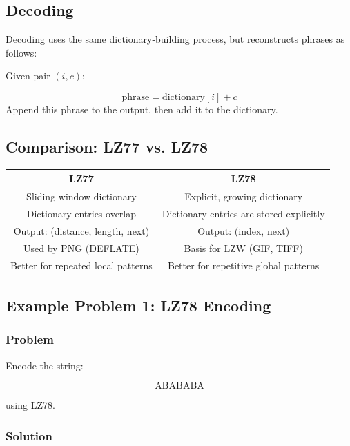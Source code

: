 \documentclass{AnantDocumentation}
\begin{document}
\subsection{Decoding}

Decoding uses the same dictionary-building process, but reconstructs phrases as follows:

Given pair \((i, c)\):

\[
\text{phrase} = \text{dictionary}[i] + c
\]
Append this phrase to the output, then add it to the dictionary.

\subsection{Comparison: LZ77 vs. LZ78}

\begin{table}[h!]
\centering
\begin{tabular}{|c|c|}
\hline
\textbf{LZ77} & \textbf{LZ78} \\
\hline
Sliding window dictionary & Explicit, growing dictionary \\
\hline
Dictionary entries overlap & Dictionary entries are stored explicitly \\
\hline
Output: (distance, length, next) & Output: (index, next) \\
\hline
Used by PNG (DEFLATE) & Basis for LZW (GIF, TIFF) \\
\hline
Better for repeated local patterns & Better for repetitive global patterns \\
\hline
\end{tabular}
\end{table}

\subsection{Example Problem 1: LZ78 Encoding}

\subsubsection*{Problem}

Encode the string:

\[
\text{ABABABA}
\]

using LZ78.

\subsubsection*{Solution}
\end{document}
